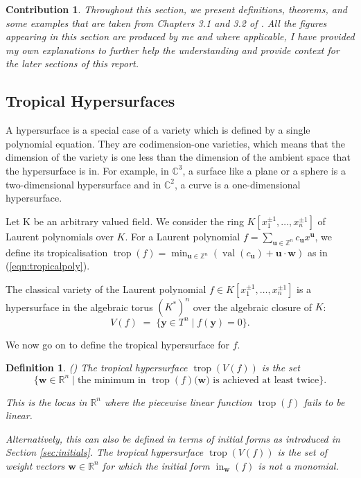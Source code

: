 \documentclass[11pt,reqno,a4paper]{article}
\theoremstyle{theoremstyle}
\theoremstyle{examplestyle}
\newtheorem{definition}[theorem]{Definition}
\newtheorem*{contribution*}{Contribution}
\theoremstyle{algorithmstyle}
\numberwithin{equation}{subsection}
\newcommand{\RR}{\mathbb{R}}
\newcommand{\ZZ}{\mathbb{Z}}
\newcommand{\CC}{\mathbb{C}}
\DeclareMathOperator{\trop}{trop}
\DeclareMathOperator{\val}{val}
\DeclareMathOperator{\initial}{in}
\begin{document}
\begin{contribution*}
    Throughout this section, we present definitions, theorems, and some examples that are taken from Chapters 3.1 and 3.2 of \cite{MS2015}. All the figures appearing in this section are produced by me and where applicable, I have provided my own explanations to further help the understanding and provide context for the later sections of this report.
\end{contribution*}

\subsection{Tropical Hypersurfaces}
A hypersurface is a special case of a variety which is defined by a single polynomial equation. They are codimension-one varieties, which means that the dimension of the variety is one less than the dimension of the ambient space that the hypersurface is in. For example, in $\CC^3$, a surface like a plane or a sphere is a two-dimensional hypersurface and in $\CC^2$, a curve is a one-dimensional hypersurface.


Let K be an arbitrary valued field. We consider the ring $K[x_1^{\pm1},\ldots,x_n^{\pm1}]$ of Laurent polynomials over $K$. For a Laurent polynomial $f = \sum_{\mathbf{u}\in\ZZ^n}c_\mathbf{u}x^\mathbf{u}$, we define its tropicalisation $\displaystyle \trop(f) = \min_{\mathbf{u}\in \ZZ^n}\left( \val(c_\mathbf{u}) + \mathbf{u}\cdot\mathbf{w} \right)$ as in (\ref{eqn:tropicalpoly}).

The classical variety of the Laurent polynomial $f \in K[x_1^{\pm1},\ldots,x_n^{\pm1}]$ is a hypersurface in the algebraic torus $(K^*)^n$ over the algebraic closure of $K$: 
\[V(f) \; = \; \{\mathbf{y}\in T^n \; | \; f(\mathbf{y}) = 0 \}.\]

We now go on to define the tropical hypersurface for $f$.

\begin{definition}
    (\cite[Def. 3.1.1]{MS2015}) The \textit{tropical hypersurface} $\trop(V(f))$ is the set \[\{\mathbf{w} \in \RR^n \; | \; \text{the minimum in } \trop(f)(\mathbf{w)} \text{ is achieved at least twice}\}.\]

    This is the locus in $\RR^n$ where the piecewise linear function $\trop(f)$ fails to be linear. 
    
    Alternatively, this can also be defined in terms of initial forms as introduced in Section \ref{sec:initials}. The tropical hypersurface $\trop(V(f))$ is the set of weight vectors $\mathbf{w}\in \RR^n$ for which the initial form $\initial_\mathbf{w}(f)$ is not a monomial. 
\end{definition}
\end{document}
